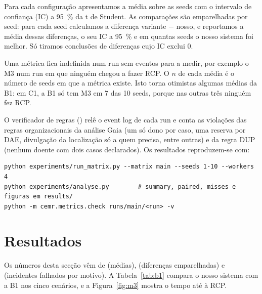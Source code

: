 \documentclass[11pt,a4paper]{article}
\begin{document}
Para cada configuração apresentamos a média sobre as seeds com o intervalo de confiança (IC) a 95~\% da t de Student. As comparações são emparelhadas por seed: para cada seed calculamos a diferença variante $-$ nosso, e reportamos a média dessas diferenças, o seu IC a 95~\% e em quantas seeds o nosso sistema foi melhor. Só tiramos conclusões de diferenças cujo IC exclui 0.

Uma métrica fica indefinida num run sem eventos para a medir, por exemplo o M3 num run em que ninguém chegou a fazer RCP. O $n$ de cada média é o número de seeds em que a métrica existe. Isto torna otimistas algumas médias da B1: em C1, a B1 só tem M3 em 7 das 10 seeds, porque nas outras três ninguém fez RCP.

O verificador de regras () relê o event log de cada run e conta as violações das regras organizacionais da análise Gaia (um só dono por caso, uma reserva por DAE, divulgação da localização só a quem precisa, entre outras) e da regra DUP (nenhum doente com dois casos declarados). Os resultados reproduzem-se com:

\begin{Verbatim}[frame=single,fontsize=\footnotesize]
python experiments/run_matrix.py --matrix main --seeds 1-10 --workers 4
python experiments/analyse.py        # summary, paired, misses e figuras em results/
python -m cemr.metrics.check runs/main/<run> -v
\end{Verbatim}

\section{Resultados}\label{sec:resultados}

Os números desta secção vêm de  (médias),  (diferenças emparelhadas) e  (incidentes falhados por motivo). A Tabela~\ref{tab:b1} compara o nosso sistema com a B1 nos cinco cenários, e a Figura~\ref{fig:m3} mostra o tempo até à RCP.
\end{document}
